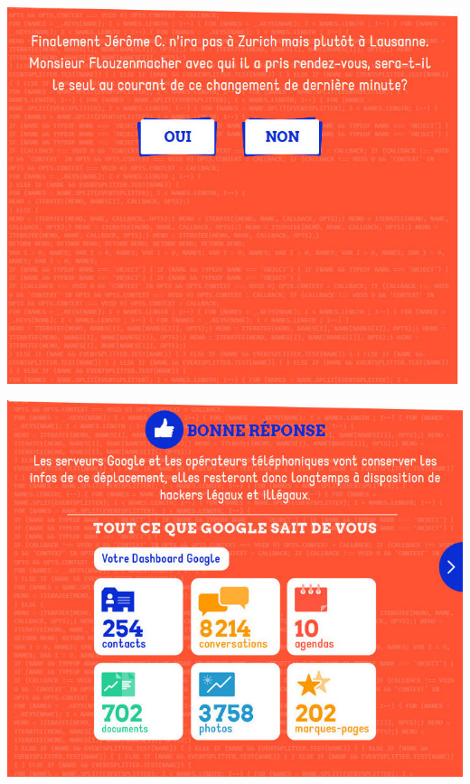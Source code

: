 \documentclass{beamer}
\begin{document}
\begin{frame}\includegraphics[scale=0.6] {./images/Quizz_HygieneNumerique_France4_12.jpg} \end{frame}
\begin{frame}\includegraphics[scale=0.6] {./images/Quizz_HygieneNumerique_France4_13.jpg} \end{frame}
\end{document}
